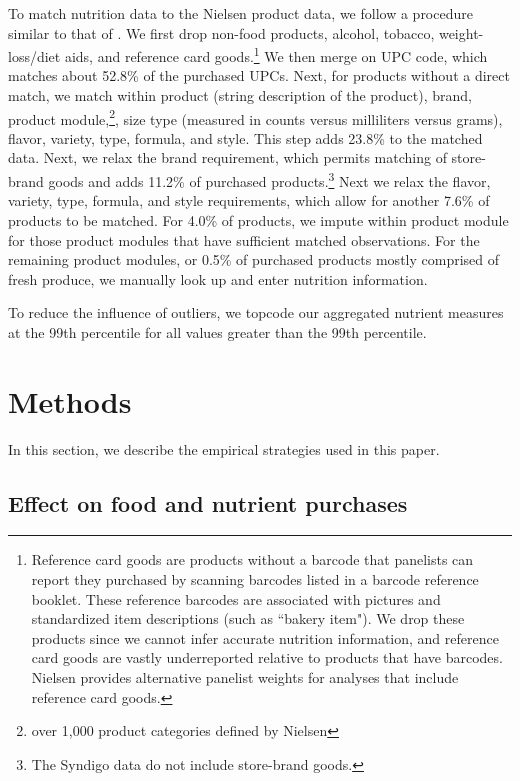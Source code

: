 \documentclass[12pt]{article}
\begin{document}
To match nutrition data to the Nielsen product data, we follow a procedure similar to that of \textcite{dubois2014prices}. We first drop non-food products, alcohol, tobacco, weight-loss/diet aids, and reference card goods.\footnote{Reference card goods are products without a barcode that panelists can report they purchased by scanning barcodes listed in a barcode reference booklet. These reference barcodes are associated with pictures and standardized item descriptions (such as ``bakery item"). We drop these products since we cannot infer accurate nutrition information, and reference card goods are vastly underreported relative to products that have barcodes. Nielsen provides alternative panelist weights for analyses that include reference card goods.} We then merge on UPC code, which matches about 52.8\% of the purchased UPCs. Next, for products without a direct match, we match within product (string description of the product), brand, product module,\footnote{over 1,000 product categories defined by Nielsen}, size type (measured in counts versus milliliters versus grams), flavor, variety, type, formula, and style. This step adds 23.8\% to the matched data. Next, we relax the brand requirement, which permits matching of store-brand goods and adds 11.2\% of purchased products.\footnote{The Syndigo data do not include store-brand goods.} Next we relax the flavor, variety, type, formula, and style requirements, which allow for another 7.6\% of products to be matched. For 4.0\% of products, we impute within product module for those product modules that have sufficient matched observations. For the remaining product modules, or 0.5\% of purchased products mostly comprised of fresh produce, we manually look up and enter nutrition information.

To reduce the influence of outliers, we topcode our aggregated nutrient measures at the 99th percentile for all values greater than the 99th percentile.


\section{Methods} \label{methods}

In this section, we describe the empirical strategies used in this paper.

\subsection{Effect on food and nutrient purchases}
\end{document}
